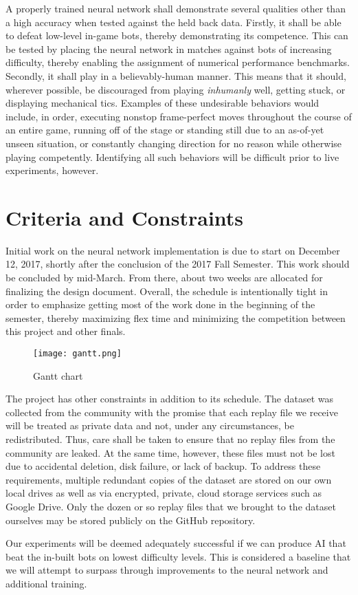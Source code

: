 A properly trained neural network shall demonstrate several qualities other than a high accuracy when tested against the held back data. Firstly, it shall be able to defeat low-level in-game bots, thereby demonstrating its competence. This can be tested by placing the neural network in matches against bots of increasing difficulty, thereby enabling the assignment of numerical performance benchmarks. Secondly, it shall play in a believably-human manner. This means that it should, wherever possible, be discouraged from playing {\it inhumanly} well, getting stuck, or displaying mechanical tics. Examples of these undesirable behaviors would include, in order, executing nonstop frame-perfect moves throughout the course of an entire game, running off of the stage or standing still due to an as-of-yet unseen situation, or constantly changing direction for no reason while otherwise playing competently. Identifying all such behaviors will be difficult prior to live experiments, however.




\section{Criteria and Constraints}

Initial work on the neural network implementation is due to start on December 12, 2017, shortly after the conclusion of the 2017 Fall Semester. This work should be concluded by mid-March. From there, about two weeks are allocated for finalizing the design document. Overall, the schedule is intentionally tight in order to emphasize getting most of the work done in the beginning of the semester, thereby maximizing flex time and minimizing the competition between this project and other finals.

\begin{figure}
	\caption{Gantt chart}
	\centering
	\texttt{[image: gantt.png]} \\
\end{figure}

The project has other constraints in addition to its schedule. The dataset was collected from the community with the promise that each replay file we receive will be treated as private data and not, under any circumstances, be redistributed. Thus, care shall be taken to ensure that no replay files from the community are leaked. At the same time, however, these files must not be lost due to accidental deletion, disk failure, or lack of backup. To address these requirements, multiple redundant copies of the dataset are stored on our own local drives as well as via encrypted, private, cloud storage services such as Google Drive. Only the dozen or so replay files that we brought to the dataset ourselves may be stored publicly on the GitHub repository.

Our experiments will be deemed adequately successful if we can produce AI that beat the in-built bots on lowest difficulty levels. This is considered a baseline that we will attempt to surpass through improvements to the neural network and additional training.


